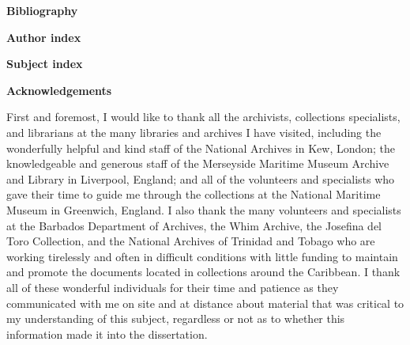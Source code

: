 \begin{styleStandard}
\textbf{Bibliography }
\end{styleStandard}

\begin{styleStandard}
\textbf{Author index}
\end{styleStandard}

\begin{styleStandard}
\textbf{Subject index}
\end{styleStandard}

\clearpage\begin{styleStandard}
\textbf{Acknowledgements}
\end{styleStandard}

\begin{styleStandard}
First and foremost, I would like to thank all the archivists, collections specialists, and librarians at the many libraries and archives I have visited, including the wonderfully helpful and kind staff of the National Archives in Kew, London; the knowledgeable and generous staff of the Merseyside Maritime Museum Archive and Library in Liverpool, England; and all of the volunteers and specialists who gave their time to guide me through the collections at the National Maritime Museum in Greenwich, England. I also thank the many volunteers and specialists at the Barbados Department of Archives, the Whim Archive, the Josefina del Toro Collection, and the National Archives of Trinidad and Tobago who are working tirelessly and often in difficult conditions with little funding to maintain and promote the documents located in collections around the Caribbean. I thank all of these wonderful individuals for their time and patience as they communicated with me on site and at distance about material that was critical to my understanding of this subject, regardless or not as to whether this information made it into the dissertation. 
\end{styleStandard}

